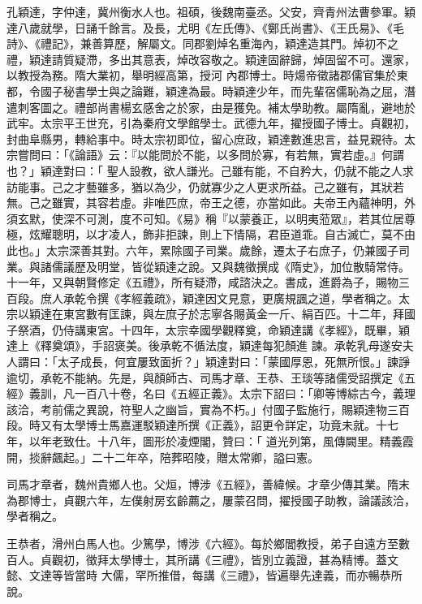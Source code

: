 \begin{pinyinscope}
 孔穎達，字仲達，冀州衡水人也。祖碩，後魏南臺丞。父安，齊青州法曹參軍。穎達八歲就學，日誦千餘言。及長，尤明《左氏傳》、《鄭氏尚書》、《王氏易》、《毛詩》、《禮記》，兼善算歷，解屬文。同郡劉焯名重海內，穎達造其門。焯初不之禮，穎達請質疑滯，多出其意表，焯改容敬之。穎達固辭歸，焯固留不可。還家，以教授為務。隋大業初，舉明經高第，授河
 內郡博士。時煬帝徵諸郡儒官集於東都，令國子秘書學士與之論難，穎達為最。時穎達少年，而先輩宿儒恥為之屈，潛遣刺客圖之。禮部尚書楊玄感舍之於家，由是獲免。補太學助教。屬隋亂，避地於武牢。太宗平王世充，引為秦府文學館學士。武德九年，擢授國子博士。貞觀初，封曲阜縣男，轉給事中。時太宗初即位，留心庶政，穎達數進忠言，益見親待。太宗嘗問曰：「《論語》云：『以能問於不能，以多問於寡，有若無，實若虛。』何謂也？」穎達對曰：「
 聖人設教，欲人謙光。己雖有能，不自矜大，仍就不能之人求訪能事。己之才藝雖多，猶以為少，仍就寡少之人更求所益。己之雖有，其狀若無。己之雖實，其容若虛。非唯匹庶，帝王之德，亦當如此。夫帝王內蘊神明，外須玄默，使深不可測，度不可知。《易》稱『以蒙養正，以明夷蒞眾』，若其位居尊極，炫耀聰明，以才凌人，飾非拒諫，則上下情隔，君臣道乖。自古滅亡，莫不由此也。」太宗深善其對。六年，累除國子司業。歲餘，遷太子右庶子，仍兼國子司
 業。與諸儒議歷及明堂，皆從穎達之說。又與魏徵撰成《隋史》，加位散騎常侍。十一年，又與朝賢修定《五禮》，所有疑滯，咸諮決之。書成，進爵為子，賜物三百段。庶人承乾令撰《孝經義疏》，穎達因文見意，更廣規諷之道，學者稱之。太宗以穎達在東宮數有匡諫，與左庶子於志寧各賜黃金一斤、絹百匹。十二年，拜國子祭酒，仍侍講東宮。十四年，太宗幸國學觀釋奠，命穎達講《孝經》，既畢，穎達上《釋奠頌》，手詔褒美。後承乾不循法度，穎達每犯顏進
 諫。承乾乳母遂安夫人謂曰：「太子成長，何宜屢致面折？」穎達對曰：「蒙國厚恩，死無所恨。」諫諍逾切，承乾不能納。先是，與顏師古、司馬才章、王恭、王琰等諸儒受詔撰定《五經》義訓，凡一百八十卷，名曰《五經正義》。太宗下詔曰：「卿等博綜古今，義理該洽，考前儒之異說，符聖人之幽旨，實為不朽。」付國子監施行，賜穎達物三百段。時又有太學博士馬嘉運駁穎達所撰《正義》，詔更令詳定，功竟未就。十七年，以年老致仕。十八年，圖形於凌煙閣，贊曰：「
 道光列第，風傳闕里。精義霞開，掞辭飆起。」二十二年卒，陪葬昭陵，贈太常卿，謚曰憲。



 司馬才章者，魏州貴鄉人也。父烜，博涉《五經》，善緯候。才章少傳其業。隋末為郡博士，貞觀六年，左僕射房玄齡薦之，屢蒙召問，擢授國子助教，論議該洽，學者稱之。



 王恭者，滑州白馬人也。少篤學，博涉《六經》。每於鄉閭教授，弟子自遠方至數百人。貞觀初，徵拜太學博士，其所講《三禮》，皆別立義證，甚為精博。蓋文懿、文達等皆當時
 大儒，罕所推借，每講《三禮》，皆遍舉先達義，而亦暢恭所說。




\end{pinyinscope}
